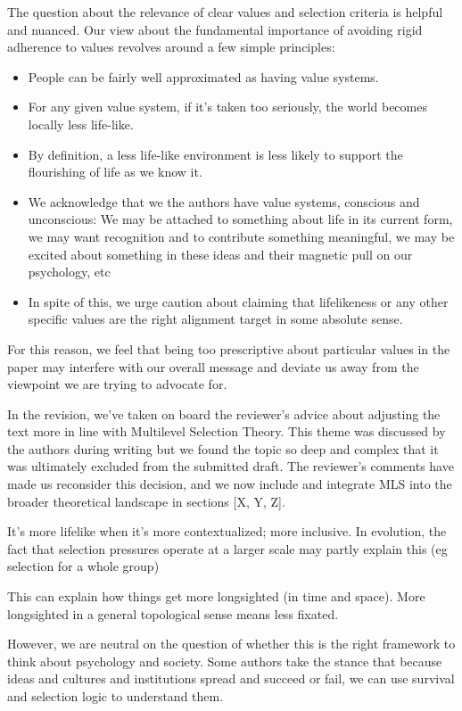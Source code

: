 \documentclass[fontsize=11.5pt]{scrartcl}
\newcounter{point}
\begin{document}
The question about the relevance of clear values and selection criteria is helpful and nuanced. Our view about the fundamental importance of avoiding rigid adherence to values revolves around a few simple principles:
\begin{itemize}
  \item People can be fairly well approximated as having value systems.
  \item For any given value system, if it's taken too seriously, the world becomes locally less life-like.
  \item By definition, a less life-like environment is less likely to support the flourishing of life as we know it.
  \item We acknowledge that we the authors have value systems, conscious and unconscious: We may be attached to something about life in its current form, we may want recognition and to contribute something meaningful, we may be excited about something in these ideas and their magnetic pull on our psychology, etc
  \item In spite of this, we urge caution about claiming that lifelikeness or any other specific values are the right alignment target in some absolute sense.
\end{itemize}

For this reason, we feel that being too prescriptive about particular values in the paper may interfere with our overall message and deviate us away from the viewpoint we are trying to advocate for.

In the revision, we've taken on board the reviewer's advice about adjusting the text more in line with Multilevel Selection Theory. This theme was discussed by the authors during writing but we found the topic so deep and complex that it was ultimately excluded from the submitted draft. The reviewer's comments have made us reconsider this decision, and we now include and integrate MLS into the broader theoretical landscape in sections [X, Y, Z].

It's more lifelike when it's more contextualized; more inclusive. In evolution, the fact that selection pressures operate at a larger scale may partly explain this (eg selection for a whole group)

This can explain how things get more longsighted (in time and space). More longsighted in a general topological sense means less fixated.

However, we are neutral on the question of whether this is the right framework to think about psychology and society. Some authors take the stance that because ideas and cultures and institutions spread and succeed or fail, we can use survival and selection logic to understand them.
\end{document}
